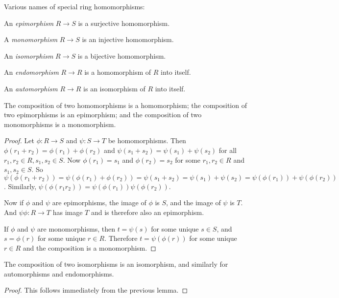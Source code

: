 \begin{Def}
  Various names of special ring homomorphisms:

  An \emph{epimorphism} $R \to S$ is a surjective homomorphism.

  A \emph{monomorphism} $R \to S$ is an injective homomorphism.

  An \emph{isomorphism} $R \to S$ is a bijective homomorphism.

  An \emph{endomorphism} $R \to R$ is a homomorphism of $R$ into itself.

  An \emph{automorphism} $R \to R$ is an isomorphism of $R$ into itself.
\end{Def}

\begin{Lemma}
The composition of two homomorphisms is a homomorphism; the composition
of two epimorphisms is an epimorphism; and the composition of two
monomorphisms is a monomorphism.
\end{Lemma}

\begin{proof}
  Let $\phi : R \to S$ and $\psi : S \to T$ be homomorphisms. Then $\phi(r_1 +
  r_2) = \phi(r_1) + \phi(r_2)$ and $\psi(s_1 + s_2) = \psi(s_1) + \psi(s_2)$
  for all $r_1, r_2 \in R, s_1, s_2 \in S$.  Now $\phi(r_1) = s_1$ and
  $\phi(r_2) = s_2$ for some $r_1, r_2 \in R$ and $s_1, s_2 \in S$. So
  $\psi(\phi(r_1 + r_2)) = \psi(\phi(r_1) + \phi(r_2)) = \psi(s_1 + s_2) =
  \psi(s_1) + \psi(s_2) = \psi(\phi(r_1)) + \psi(\phi(r_2))$.  Similarly,
  $\psi(\phi(r_1 r_2)) = \psi(\phi(r_1)) \psi(\phi(r_2))$.

  Now if $\phi$ and $\psi$ are epimorphisms, the image of $\phi$ is $S$, and
  the image of $\psi$ is $T$. And $\psi \phi : R \to T$ has image $T$ and is
  therefore also an epimorphism.

  If $\phi$ and $\psi$ are monomorphisms, then $t = \psi(s)$ for some unique $s
  \in S$, and $s = \phi(r)$ for some unique $r \in R$. Therefore $t = \psi (
  \phi (r) )$ for some unique $r \in R$ and the composition is a monomorphism.
\end{proof}

\begin{Cor}
  The composition of two isomorphisms is an isomorphism, and similarly for
  automorphisms and endomorphisms.
\end{Cor}

\begin{proof}
  This follows immediately from the previous lemma.
\end{proof}

